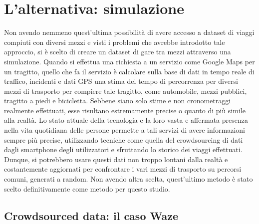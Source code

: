 \section{L'alternativa: simulazione}

Non avendo nemmeno quest'ultima possibilità di avere accesso a dataset di viaggi compiuti con diversi mezzi e visti i problemi che avrebbe introdotto tale approccio, si è scelto di creare un dataset di gare tra mezzi attraverso una simulazione. Quando si effettua una richiesta a un servizio come Google Maps per un tragitto, quello che fa il servizio è calcolare sulla base di dati in tempo reale di traffico, incidenti e dati GPS una stima del tempo di percorrenza per diversi mezzi di trasporto per compiere tale tragitto, come automobile, mezzi pubblici, tragitto a piedi e bicicletta. Sebbene siano solo stime e non cronometraggi realmente effettuati, esse risultano estremamente precise o quanto di più simile alla realtà. Lo stato attuale della tecnologia e la loro vasta e affermata presenza nella vita quotidiana delle persone permette a tali servizi di avere informazioni sempre più precise, utilizzando tecniche come quella del crowdsourcing di dati dagli smartphone degli utilizzatori e sfruttando lo storico dei viaggi effettuati. Dunque, si potrebbero usare questi dati non troppo lontani dalla realtà e costantemente aggiornati per confrontare i vari mezzi di trasporto su percorsi comuni, generati a random. Non avendo altra scelta, quest'ultimo metodo è stato scelto definitivamente come metodo per questo studio.

\subsection{Crowdsourced data: il caso Waze}

